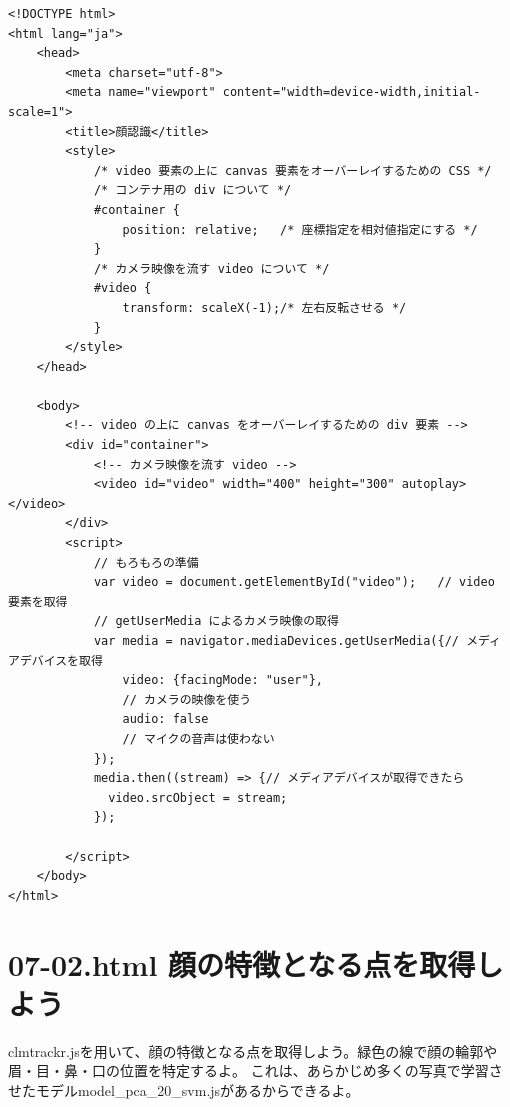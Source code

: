 \documentclass[mingoth,11pt,a4j,uplatex]{jsarticle}
\begin{document}
\begin{lstlisting}[caption=07-01.html]
<!DOCTYPE html>
<html lang="ja">
    <head>
        <meta charset="utf-8">
        <meta name="viewport" content="width=device-width,initial-scale=1">
        <title>顔認識</title>
        <style>
            /* video 要素の上に canvas 要素をオーバーレイするための CSS */
            /* コンテナ用の div について */
            #container {              
                position: relative;   /* 座標指定を相対値指定にする */
            }
            /* カメラ映像を流す video について */
            #video {                  
                transform: scaleX(-1);/* 左右反転させる */
            }
        </style>
    </head>

    <body>
        <!-- video の上に canvas をオーバーレイするための div 要素 -->
        <div id="container">  
            <!-- カメラ映像を流す video -->
            <video id="video" width="400" height="300" autoplay></video>
        </div>
        <script>
            // もろもろの準備
            var video = document.getElementById("video");   // video 要素を取得
            // getUserMedia によるカメラ映像の取得
            var media = navigator.mediaDevices.getUserMedia({// メディアデバイスを取得
                video: {facingMode: "user"},                          
                // カメラの映像を使う
                audio: false                                          
                // マイクの音声は使わない
            });
            media.then((stream) => {// メディアデバイスが取得できたら
              video.srcObject = stream;
            });

        </script>
    </body>
</html>
\end{lstlisting}

\newpage
\section{07-02.html 顔の特徴となる点を取得しよう}
clmtrackr.jsを用いて、顔の特徴となる点を取得しよう。緑色の線で顔の輪郭や眉・目・鼻・口の位置を特定するよ。
これは、あらかじめ多くの写真で学習させたモデルmodel\_pca\_20\_svm.jsがあるからできるよ。
\end{document}
